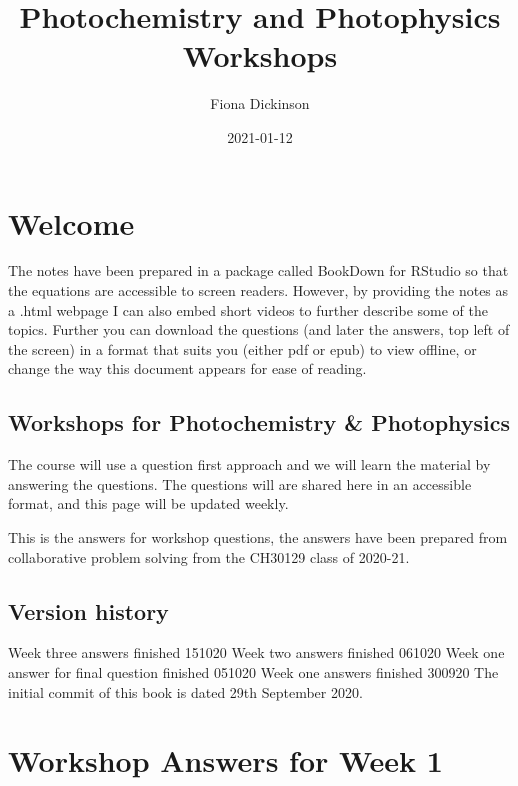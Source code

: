 \documentclass[
]{book}
\title{Photochemistry and Photophysics Workshops}
\author{Fiona Dickinson}
\date{2021-01-12}
\begin{document}
\maketitle

{
\setcounter{tocdepth}{1}
\tableofcontents
}
\hypertarget{welcome}{%
\chapter*{Welcome}\label{welcome}}

The notes have been prepared in a package called BookDown for RStudio so that the equations are accessible to screen readers. However, by providing the notes as a .html webpage I can also embed short videos to further describe some of the topics. Further you can download the questions (and later the answers, top left of the screen) in a format that suits you (either pdf or epub) to view offline, or change the way this document appears for ease of reading.

\hypertarget{workshops-for-photochemistry-photophysics}{%
\section*{Workshops for Photochemistry \& Photophysics}\label{workshops-for-photochemistry-photophysics}}

The course will use a question first approach and we will learn the material by answering the questions. The questions will are shared here in an accessible format, and this page will be updated weekly.

This is the answers for workshop questions, the answers have been prepared from collaborative problem solving from the CH30129 class of 2020-21.

\hypertarget{version-history}{%
\section*{Version history}\label{version-history}}

Week three answers finished 151020
Week two answers finished 061020
Week one answer for final question finished 051020
Week one answers finished 300920
The initial commit of this book is dated 29th September 2020.

\hypertarget{ch:Workshop1}{%
\chapter{Workshop Answers for Week 1}\label{ch:Workshop1}}
\end{document}
